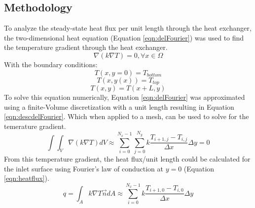 \documentclass[11pt]{article}%
\begin{document}
\subsection {Methodology}
\label{sec:analysismethod}
To analyze the steady-state heat flux per unit length through the heat exchanger, the two-dimensional heat equation (Equation \ref{eqn:delFourier}) was used to find the temperature gradient through the heat exchanger.
\begin{equation}
\label{eqn:delFourier}
\nabla (k\nabla T)=0, \forall x \in \Omega
\end{equation}
 With the boundary conditions:
\begin{equation*}
T(x,y=0)=T_{bottom}
\end{equation*}
\begin{equation*}
T(x,y(x))=T_{top}
\end{equation*}
\begin{equation*}
T(x,y)=T(x+L,y)
\end{equation*}
To solve this equation numerically, Equation \ref{eqn:delFourier} was approximated using a finite-Volume discretization with a unit length resulting in Equation \ref{eqn:descdelFourier}. Which when applied to a mesh, can be used to solve for the temerature gradient.
 \begin{equation}
\label{eqn:descdelFourier}
\int\int_{V}\nabla (k\nabla T)dV\approx\sum_{i=0}^{N_{x}-1}\sum_{j=0}^{N_{y}} k\frac{T_{i+1,j}-T_{i,j}}{\Delta x}\Delta y=0
\end{equation}
From this temperature gradient, the heat flux/unit length could be calculated for the inlet surface using Fourier's law of conduction at $y=0$ (Equation \ref{eqn:heatflux}).
\begin{equation}
\label{eqn:heatflux}
q=\int_{A} k\nabla T \vec{n}dA\approx\sum_{i=0}^{N_{x}-1} k\frac{T_{i+1,0}-T_{i,0}}{\Delta x}\Delta y
\end{equation}
\end{document}

